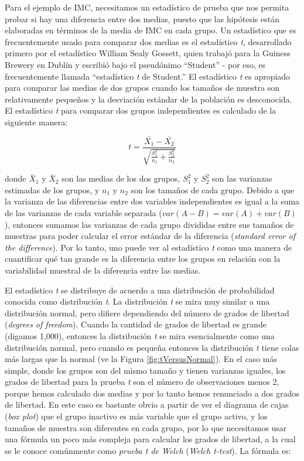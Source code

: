 \documentclass[
  12pt,
]{book}
\begin{document}
Para el ejemplo de IMC, necesitamos un estadístico de prueba que nos permita probar si hay una diferencia entre dos medias, puesto que las hipótesis están elaboradas en términos de la media de IMC en cada grupo. Un estadístico que es frecuentemente usado para comparar dos medias es el estadístico \emph{t}, desarrollado primero por el estadístico William Sealy Gossett, quien trabajó para la Guiness Brewery en Dublín y escribió bajo el pseudónimo ``Student'' - por eso, es frecuentemente llamada ``estadístico \emph{t} de Student.'' El estadístico \emph{t} es apropiado para comparar las medias de dos grupos cuando los tamaños de muestra son relativamente pequeños y la desviación estándar de la población es desconocida. El estadístico \emph{t} para comparar dos grupos independientes es calculado de la siguiente manera:

\[
t = \frac{\bar{X_1} - \bar{X_2}}{\sqrt{\frac{S_1^2}{n_1} + \frac{S_2^2}{n_2}}}
\]

donde \(\bar{X}_1\) y \(\bar{X}_2\) son las medias de los dos grupos, \(S^2_1\) y \(S^2_2\) son las varianzas estimadas de los grupos, y \(n_1\) y \(n_2\) son los tamaños de cada grupo. Debido a que la varianza de las diferencias entre dos variables independientes es igual a la suma de las varianzas de cada variable separada (\(var(A - B) = var(A) + var(B)\)), entonces sumamos las varianzas de cada grupo divididas entre sus tamaños de muestras para poder calcular el error estándar de la diferencia (\emph{standard error of the difference}). Por lo tanto, uno puede ver al estadístico \emph{t} como una manera de cuantificar qué tan grande es la diferencia entre los grupos en relación con la variabilidad muestral de la diferencia entre las medias.

El estadístico \emph{t} se distribuye de acuerdo a una distribución de probabilidad conocida como distribución \emph{t}. La distribución \emph{t} se mira muy similar a una distribución normal, pero difiere dependiendo del número de grados de libertad (\emph{degrees of freedom}). Cuando la cantidad de grados de libertad es grande (digamos 1,000), entonces la distribución \emph{t} se mira esencialmente como una distribución normal, pero cuando es pequeña entonces la distribución \emph{t} tiene colas más largas que la normal (ve la Figura \ref{fig:tVersusNormal}). En el caso más simple, donde los grupos son del mismo tamaño y tienen varianzas iguales, los grados de libertad para la prueba \emph{t} son el número de observaciones menos 2, porque hemos calculado dos medias y por lo tanto hemos renunciado a dos grados de libertad. En este caso es bastante obvio a partir de ver el diagrama de cajas (\emph{box plot}) que el grupo inactivo es más variable que el grupo activo, y los tamaños de muestra son diferentes en cada grupo, por lo que necesitamos usar una fórmula un poco más compleja para calcular los grados de libertad, a la cual se le conoce comúnmente como \emph{prueba t de Welch} (\emph{Welch t-test}). La fórmula es:
\end{document}
